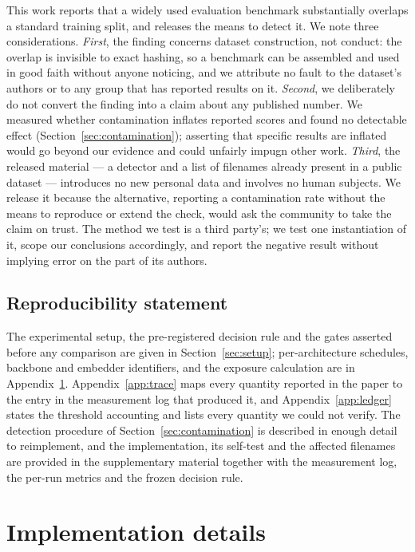 \documentclass{article}
\begin{document}
This work reports that a widely used evaluation benchmark substantially overlaps
a standard training split, and releases the means to detect it. We note three
considerations. \emph{First}, the finding concerns dataset construction, not
conduct: the overlap is invisible to exact hashing, so a benchmark can be
assembled and used in good faith without anyone noticing, and we attribute no
fault to the dataset's authors or to any group that has reported results on it.
\emph{Second}, we deliberately do not convert the finding into a claim about any
published number. We measured whether contamination inflates reported scores and
found no detectable effect (Section~\ref{sec:contamination}); asserting that
specific results are inflated would go beyond our evidence and could unfairly
impugn other work. \emph{Third}, the released material --- a detector and a list
of filenames already present in a public dataset --- introduces no new personal
data and involves no human subjects. We release it because the alternative,
reporting a contamination rate without the means to reproduce or extend the
check, would ask the community to take the claim on trust. The method we test is
a third party's; we test one instantiation of it, scope our conclusions
accordingly, and report the negative result without implying error on the part
of its authors.

\subsection*{Reproducibility statement}
The experimental setup, the pre-registered decision rule and the gates asserted
before any comparison are given in Section~\ref{sec:setup}; per-architecture
schedules, backbone and embedder identifiers, and the exposure calculation are
in Appendix~\ref{app:impl}. Appendix~\ref{app:trace} maps every quantity
reported in the paper to the entry in the measurement log that produced it, and
Appendix~\ref{app:ledger} states the threshold accounting and lists every
quantity we could not verify. The detection procedure of
Section~\ref{sec:contamination} is described in enough detail to reimplement,
and the implementation, its self-test and the affected filenames are provided in
the supplementary material together with the measurement log, the per-run
metrics and the frozen decision rule.




\appendix

\section{Implementation details}
\label{app:impl}
\end{document}
